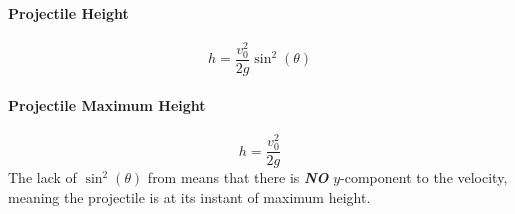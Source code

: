 \paragraph{Projectile Height} \label{par:Projectile Height}
\begin{equation} \label{eq:Projectile Height}
  h = \frac{v_{0}^{2}}{2g} \sin^{2} ( \theta )
\end{equation}

\paragraph{Projectile Maximum Height} \label{par:Projectile Maximum Height}
\begin{equation}
  h = \frac{v_{0}^{2}}{2g}
\end{equation}
The lack of $\sin^{2} ( \theta )$ from  means that there is \textbf{\emph{NO}} $y$-component to the velocity, meaning the projectile is at its instant of maximum height.